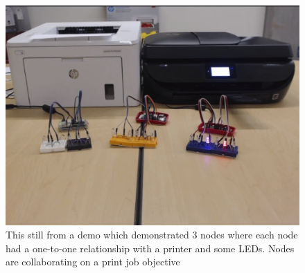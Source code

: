 \documentclass[draftclsnofoot, onecolumn, compsoc, 10pt]{IEEEtran}
\begin{document}
\begin{figure}[H]
\centering
    \includegraphics[scale=0.45]{setup}
    \caption{This still from a demo which demonstrated 3 nodes where each node had a one-to-one relationship with a printer and some LEDs. Nodes are collaborating on a print job objective}
\end{figure}

\newpage
\nocite{*}


\end{document}
